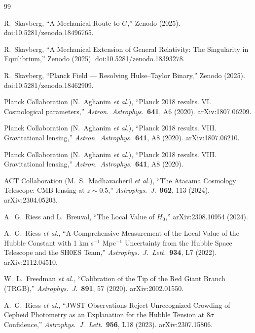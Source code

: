 \documentclass[11pt,a4paper]{article}
\theoremstyle{definition}
\begin{document}
\begin{thebibliography}{99}
\setlength{\itemsep}{2pt}

R.~Skavberg, ``A Mechanical Route to $G$,'' Zenodo (2025). doi:10.5281/zenodo.18496765.

R.~Skavberg, ``A Mechanical Extension of General Relativity: The Singularity in Equilibrium,'' Zenodo (2025). doi:10.5281/zenodo.18393278.

R.~Skavberg, ``Planck Field --- Resolving Hulse--Taylor Binary,'' Zenodo (2025). doi:10.5281/zenodo.18462909.

Planck Collaboration (N.~Aghanim \emph{et al.}), ``Planck 2018 results. VI. Cosmological parameters,'' \emph{Astron.\ Astrophys.}\ \textbf{641}, A6 (2020). arXiv:1807.06209.

Planck Collaboration (N.~Aghanim \emph{et al.}), ``Planck 2018 results. VIII. Gravitational lensing,'' \emph{Astron.\ Astrophys.}\ \textbf{641}, A8 (2020). arXiv:1807.06210.

Planck Collaboration (N.~Aghanim \emph{et al.}), ``Planck 2018 results. VIII. Gravitational lensing,'' \emph{Astron.\ Astrophys.}\ \textbf{641}, A8 (2020).

ACT Collaboration (M.~S.~Madhavacheril \emph{et al.}), ``The Atacama Cosmology Telescope: CMB lensing at $z\sim 0.5$,'' \emph{Astrophys.\ J.}\ \textbf{962}, 113 (2024). arXiv:2304.05203.

A.~G.~Riess and L.~Breuval, ``The Local Value of $H_0$,'' arXiv:2308.10954 (2024).

A.~G.~Riess \emph{et al.}, ``A Comprehensive Measurement of the Local Value of the Hubble Constant with 1 km s$^{-1}$ Mpc$^{-1}$ Uncertainty from the Hubble Space Telescope and the SH0ES Team,'' \emph{Astrophys.\ J.\ Lett.}\ \textbf{934}, L7 (2022). arXiv:2112.04510.

W.~L.~Freedman \emph{et al.}, ``Calibration of the Tip of the Red Giant Branch (TRGB),'' \emph{Astrophys.\ J.}\ \textbf{891}, 57 (2020). arXiv:2002.01550.

A.~G.~Riess \emph{et al.}, ``JWST Observations Reject Unrecognized Crowding of Cepheid Photometry as an Explanation for the Hubble Tension at $8\sigma$ Confidence,'' \emph{Astrophys.\ J.\ Lett.}\ \textbf{956}, L18 (2023). arXiv:2307.15806.


\end{thebibliography}
\end{document}
